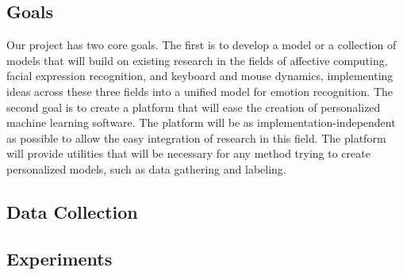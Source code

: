 \documentclass[../main.tex]{subfiles}
\begin{document}
\subsection{Goals}
Our project has two core goals. The first is to develop a model or a collection of models that will build on existing research in
the fields of affective computing, facial expression recognition, and keyboard and mouse dynamics, implementing ideas across these
three fields into a unified model for emotion recognition.
The second goal is to create a platform that will ease the creation of personalized machine learning software.
The platform will be as implementation-independent as possible to allow the easy integration of research in this field.
The platform will provide utilities that will be necessary for any method trying to create personalized models,
such as data gathering and labeling.

\subsection{Data Collection}


\subsection{Experiments}

\end{document}

